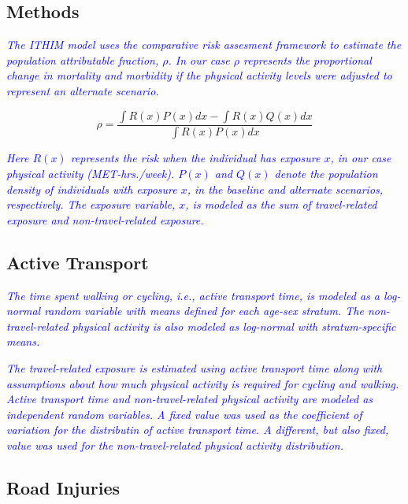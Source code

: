 \documentclass{bioinfo}
\newcommand{\col}[2][red]{\textcolor{#1}{#2}}
\newcommand{\af}{\rho}
\newcommand{\mets}{MET-hrs./week}
\begin{document}
\begin{methods}

\section{Methods}

\col[blue]{\textit{
    The ITHIM model uses the comparative risk
    assesment framework to estimate the population attributable
    fraction, $\af$.  In our case $\af$ represents the proportional
    change in mortality and morbidity if the physical activity levels
    were adjusted to represent an alternate scenario.
}}

\begin{equation}
\af = \frac{\int R(x)P(x) dx  - \int R(x)Q(x) dx }{\int R(x)P(x) dx}
\end{equation}

\col[blue]{\textit{
    Here $R(x)$ represents the risk when the individual has exposure $x$,
in our case physical activity (\mets).  $P(x)$ and $Q(x)$ denote the
population density of individuals with exposure $x$, in the baseline
and alternate scenarios, respectively.  The exposure variable, $x$, is
modeled as the sum of travel-related exposure and non-travel-related
exposure.
}}

\subsection{Active Transport}

\col[blue]{\textit{The time spent walking or cycling, i.e., active
    transport time, is modeled as a log-normal random variable with
    means defined for each age-sex stratum.  The non-travel-related
    physical activity is also modeled as log-normal with
    stratum-specific means.}}

\col[blue]{\textit{
The travel-related exposure is estimated using active transport time
along with assumptions about how much physical activity is required
for cycling and walking.  Active transport time and non-travel-related
physical activity are modeled as independent random variables.  A
fixed value was used as the coefficient of variation for the
distributin of active transport time. A different, but also fixed,
value was used for the non-travel-related physical activity
distribution.
}}

\subsection{Road Injuries}


\end{methods}
\end{document}
